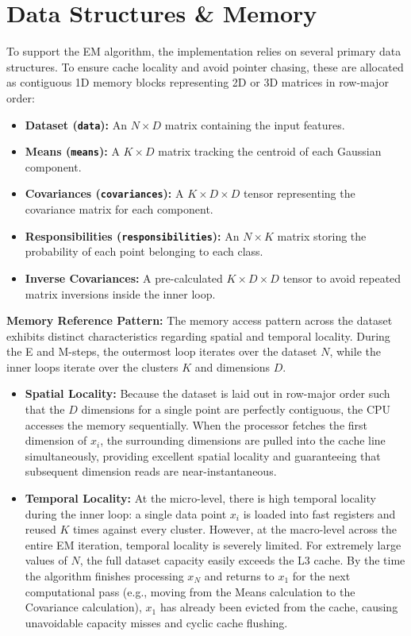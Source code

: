 \documentclass[10pt]{article}
\begin{document}
\section{Data Structures \& Memory}
To support the EM algorithm, the implementation relies on several primary data structures. To ensure cache locality and avoid pointer chasing, these are allocated as contiguous 1D memory blocks representing 2D or 3D matrices in row-major order:
\begin{itemize}
    \item \textbf{Dataset (\texttt{data}):} An $N \times D$ matrix containing the input features.
    \item \textbf{Means (\texttt{means}):} A $K \times D$ matrix tracking the centroid of each Gaussian component.
    \item \textbf{Covariances (\texttt{covariances}):} A $K \times D \times D$ tensor representing the covariance matrix for each component.
    \item \textbf{Responsibilities (\texttt{responsibilities}):} An $N \times K$ matrix storing the probability of each point belonging to each class.
    \item \textbf{Inverse Covariances:} A pre-calculated $K \times D \times D$ tensor to avoid repeated matrix inversions inside the inner loop.
\end{itemize}

\textbf{Memory Reference Pattern:} The memory access pattern across the dataset exhibits distinct characteristics regarding spatial and temporal locality. During the E and M-steps, the outermost loop iterates over the dataset $N$, while the inner loops iterate over the clusters $K$ and dimensions $D$.

\begin{itemize}
    \item \textbf{Spatial Locality:} Because the dataset is laid out in row-major order such that the $D$ dimensions for a single point are perfectly contiguous, the CPU accesses the memory sequentially. When the processor fetches the first dimension of $x_i$, the surrounding dimensions are pulled into the cache line simultaneously, providing excellent spatial locality and guaranteeing that subsequent dimension reads are near-instantaneous.
    \item \textbf{Temporal Locality:} At the micro-level, there is high temporal locality during the inner loop: a single data point $x_i$ is loaded into fast registers and reused $K$ times against every cluster. However, at the macro-level across the entire EM iteration, temporal locality is severely limited. For extremely large values of $N$, the full dataset capacity easily exceeds the L3 cache. By the time the algorithm finishes processing $x_N$ and returns to $x_1$ for the next computational pass (e.g., moving from the Means calculation to the Covariance calculation), $x_1$ has already been evicted from the cache, causing unavoidable capacity misses and cyclic cache flushing.
\end{itemize}
\end{document}
